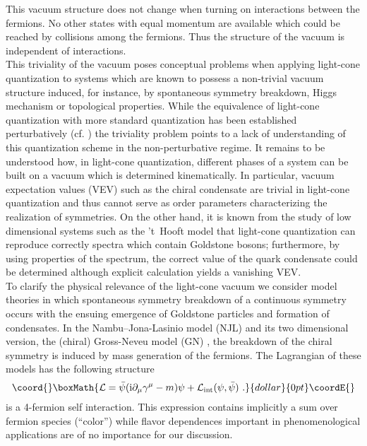 \documentclass[a4paper,12pt]{article}
\begin{document}
This vacuum structure does not change when turning on interactions between the fermions.
No other states with equal momentum are available which could be reached by collisions
among the fermions. Thus the structure of the vacuum is independent of interactions.\\
This triviality of the vacuum  poses conceptual problems when applying light-cone quantization to
systems which are known to possess a non-trivial vacuum structure induced, for instance, by
spontaneous symmetry breakdown, Higgs mechanism or topological properties.
While the equivalence of light-cone quantization with more standard quantization has been
established perturbatively (cf. \cite{BPP98}) the triviality problem points to a lack of
understanding of this quantization scheme in the non-perturbative regime. It remains to be
understood how, in light-cone quantization,  different phases of a system can be built on a
vacuum which is determined kinematically. In particular, vacuum expectation values (VEV)
such as the chiral condensate \coordHE{} are trivial in light-cone
quantization and thus cannot serve as order parameters characterizing the realization of
symmetries. On the other hand, it is known from the study of low dimensional systems
such as the 't~Hooft model \cite{tHooft74} that light-cone quantization can reproduce correctly
spectra which
contain Goldstone bosons; furthermore, by using properties of the spectrum, the
correct value of the quark condensate could be determined \cite{Zhitnitsky} although
explicit calculation yields a vanishing VEV. \\
To clarify the physical relevance of the light-cone vacuum we
consider model theories in which spontaneous symmetry breakdown
of a continuous symmetry  occurs with the ensuing emergence of
Goldstone particles and formation of condensates. In the
Nambu--Jona-Lasinio model (NJL) \cite{NJL61} and its two dimensional
version, the (chiral) Gross-Neveu model (GN) \cite{GN74}, the breakdown of the chiral symmetry
is induced by mass generation of the fermions. The Lagrangian of these models has the following
structure
$$\coord{}\boxMath{{\cal L}= \bar{\psi}({\rm i}\partial_{\mu}\gamma^{\mu}-m)\psi+{\cal L}_{\rm int}
(\psi,\bar{\psi}) \ .}{dollar}{0pt}\coordE{}$$  \coordHE{} is a 4-fermion self interaction.
This expression contains implicitly a sum over  fermion species (``color'') while flavor
dependences important in phenomenological applications are of no importance for our discussion.
\end{document}

